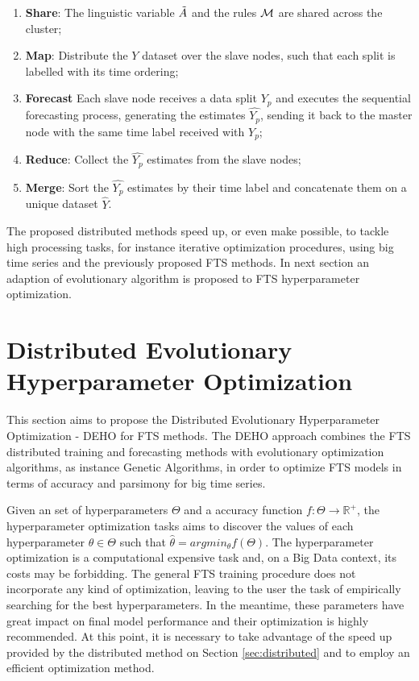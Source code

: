  \begin{enumerate}
    \item \textbf{Share}: The linguistic variable $\tilde{A}$ and the rules $\mathcal{M}$ are shared across the cluster; 
    \item \textbf{Map}: Distribute the $Y$ dataset over the slave nodes, such that each split is labelled with its time ordering;
    \item \textbf{Forecast} Each slave node receives a data split $Y_p$ and executes the sequential forecasting process, generating the estimates $\hat{Y_p}$, sending it back to the master node with the same time label received with $Y_p$;
    \item \textbf{Reduce}: Collect the $\hat{Y_p}$ estimates from the slave nodes;
    \item \textbf{Merge}: Sort the $\hat{Y_p}$ estimates by their time label and concatenate them on a unique dataset $\hat{Y}$.
\end{enumerate}


The proposed distributed methods speed up, or even make possible, to tackle high processing tasks, for instance iterative optimization procedures, using big time series and the previously proposed FTS methods. In next section an adaption of evolutionary algorithm is proposed to FTS hyperparameter optimization. 


\section{Distributed Evolutionary Hyperparameter Optimization}
\label{sec:hyperparameter}

This section aims to propose the Distributed Evolutionary Hyperparameter Optimization - DEHO for FTS methods. The DEHO approach combines the FTS distributed training and forecasting methods with evolutionary optimization algorithms, as instance Genetic Algorithms, in order to optimize FTS models in terms of accuracy and parsimony for big time series.

Given an set of hyperparameters $\Theta$ and a accuracy function $f: \Theta \rightarrow \mathbb{R}^+$, the hyperparameter optimization tasks aims to discover the values of each hyperparameter $\theta \in \Theta$ such that $\hat{\theta} = argmin_\theta f(\Theta)$. The hyperparameter optimization is a computational expensive task and, on a Big Data context, its costs may be forbidding. The general FTS training procedure does not incorporate any kind of optimization, leaving to the user the task of empirically searching for the best hyperparameters. In the meantime, these parameters have great impact on final model performance and their optimization is highly recommended. At this point, it is necessary to take advantage of the speed up provided by the distributed method on Section \ref{sec:distributed} and to employ an efficient optimization method. 

